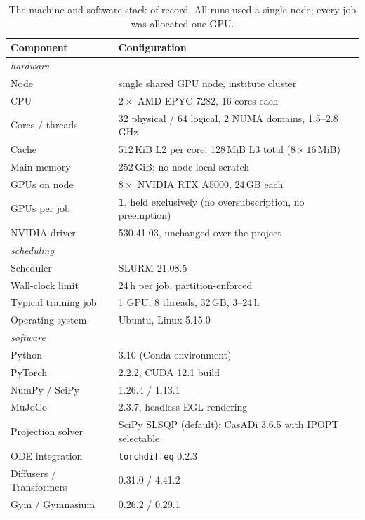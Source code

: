 \begin{table}[htpb]
  \caption[Compute environment]{The machine and software stack of record. All runs used a single
  node; every job was allocated one GPU.}
  \label{tab:compute}
  \centering
  \begin{tabular}{ll}
    \toprule
    Component & Configuration \\
    \midrule
    \multicolumn{2}{l}{\emph{hardware}}\\
    Node                    & single shared GPU node, institute cluster \\
    CPU                     & $2\times$ AMD EPYC 7282, 16 cores each \\
    Cores / threads         & 32 physical / 64 logical, 2 NUMA domains, 1.5--2.8\,GHz \\
    Cache                   & 512\,KiB L2 per core; 128\,MiB L3 total ($8\times16$\,MiB) \\
    Main memory             & 252\,GiB; no node-local scratch \\
    GPUs on node            & $8\times$ NVIDIA RTX A5000, 24\,GB each \\
    GPUs per job            & \textbf{1}, held exclusively (no oversubscription, no preemption) \\
    NVIDIA driver           & 530.41.03, unchanged over the project \\
    \midrule
    \multicolumn{2}{l}{\emph{scheduling}}\\
    Scheduler               & SLURM 21.08.5 \\
    Wall-clock limit        & 24\,h per job, partition-enforced \\
    Typical training job    & 1 GPU, 8 threads, 32\,GB, 3--24\,h \\
    Operating system        & Ubuntu, Linux 5.15.0 \\
    \midrule
    \multicolumn{2}{l}{\emph{software}}\\
    Python                  & 3.10 (Conda environment) \\
    PyTorch                 & 2.2.2, CUDA 12.1 build \\
    NumPy / SciPy           & 1.26.4 / 1.13.1 \\
    MuJoCo                  & 2.3.7, headless EGL rendering \\
    Projection solver       & SciPy SLSQP (default); CasADi 3.6.5 with IPOPT selectable \\
    ODE integration         & \texttt{torchdiffeq} 0.2.3 \\
    Diffusers / Transformers & 0.31.0 / 4.41.2 \\
    Gym / Gymnasium         & 0.26.2 / 0.29.1 \\
    \bottomrule
  \end{tabular}
\end{table}

